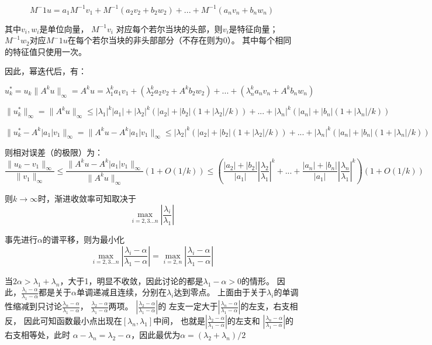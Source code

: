 \documentclass[UTF8,zihao=5]{ctexart}
\begin{document}
$$
    M^-1u=a_1M^{-1}v_1 + M^{-1}(a_2v_2 + b_2w_2) +...+ M^{-1}(a_nv_n + b_nw_n)
$$

其中$v_i,w_i$是单位向量， $M^{-1}v_i$
对应每个若尔当块的头部，则$v_i$是特征向量；$M^{-1}w_2$对应$M^-1u$在每个若尔当块的非头部部分（不存在则为0）。
其中每个相同的特征值只使用一次。

因此，幂迭代后，有：

$$
    u_k^*=u_k{\|A^ku\|_\infty}=A^ku
    =\lambda_1^ka_1v_1 + (\lambda_2^ka_2v_2 + A^kb_2w_2) +...+ (\lambda_n^ka_nv_n + A^kb_nw_n)
$$

$$
    \|u_k^*\|_\infty =\|A^ku\|_\infty \leq
    |\lambda_1|^k|a_1| + |\lambda_2|^k(|a_2| + |b_2|(1+|\lambda_2|/k)) + ...+ |\lambda_n|^k(|a_n| + |b_n|(1+|\lambda_n|/k))
$$

$$
    \|u_k^* - A^k|a_1|v_1\|_\infty =\|A^ku - A^k|a_1|v_1\|_\infty \leq
    |\lambda_2|^k(|a_2| + |b_2|(1+|\lambda_2|/k)) + ...+ |\lambda_n|^k(|a_n| + |b_n|(1+|\lambda_n|/k))
$$

则相对误差（的极限）为：
$$
    \frac{\|u_k-v_1\|_\infty}{\|v_1\|_\infty}
    \leq
    \frac{\|A^ku -  A^k|a_1|v_1\|_\infty}{\|A^ku\|_\infty}(1+O(1/k))
    \leq\left(
    \frac{|a_2|+|b_2|}{|a_1|}\left|\frac{\lambda_2}{\lambda_1}\right|^k
    +...+
    \frac{|a_n|+|b_n|}{|a_1|}\left|\frac{\lambda_n}{\lambda_1}\right|^k
    \right)(1+O(1/k))
$$

则$k\rightarrow\infty$时，渐进收敛率可知取决于
$$
    \max_{i=2,3...n}\left|\frac{\lambda_i}{\lambda_1}\right|
$$

事先进行$\alpha$的谱平移，则为最小化
$$
    \max_{i=2,3...n}\left|\frac{\lambda_i-\alpha}{\lambda_1-\alpha}\right|=\max_{i=2,n}\left|\frac{\lambda_i-\alpha}{\lambda_1-\alpha}\right|
$$

当$2\alpha>\lambda_1 + \lambda_n$，大于1，明显不收敛，因此讨论的都是$\lambda_1-\alpha>0$的情形。
因此，$\frac{\lambda_i-\alpha}{\lambda_1-\alpha}$都是关于$\alpha$单调递减且连续，分别在$\lambda_i$达到零点。
上面由于关于$\lambda_i$的单调性缩减到只讨论$\frac{\lambda_n-\alpha}{\lambda_1-\alpha}$，
$\frac{\lambda_2-\alpha}{\lambda_1-\alpha}$两项。
$\left|\frac{\lambda_2-\alpha}{\lambda_1-\alpha}\right|$的
左支一定大于$\left|\frac{\lambda_n-\alpha}{\lambda_1-\alpha}\right|$的左支，右支相反，
因此可知函数最小点出现在$[\lambda_n,\lambda_1]$中间，
也就是$\left|\frac{\lambda_2-\alpha}{\lambda_1-\alpha}\right|$的左支和
$\left|\frac{\lambda_n-\alpha}{\lambda_1-\alpha}\right|$的右支相等处，此时
$\alpha-\lambda_n=\lambda_2-\alpha$，因此最优为$\alpha=(\lambda_2+\lambda_n)/2$
\end{document}
